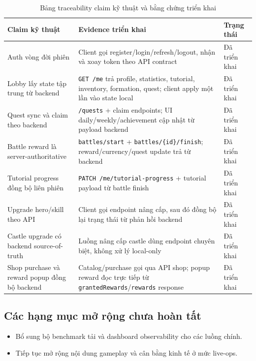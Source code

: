 \begin{table}[H]
\centering
\renewcommand{\arraystretch}{1.2}
\setlength{\tabcolsep}{6pt}
\begin{tabularx}{\textwidth}{|L{4.5cm}|Y|L{3.8cm}|}
\hline
\textbf{Claim kỹ thuật} & \textbf{Evidence triển khai} & \textbf{Trạng thái} \\
\hline
Auth vòng đời phiên & Client gọi register/\allowbreak login/\allowbreak refresh/\allowbreak logout, nhận và xoay token theo API contract & Đã triển khai \\
\hline
Lobby lấy state tập trung từ backend & \texttt{GET /me} trả profile, statistics, tutorial, inventory, formation, quest; client apply một lần vào state local & Đã triển khai \\
\hline
Quest sync và claim theo backend & \texttt{/quests} + claim endpoints; UI daily/\allowbreak weekly/\allowbreak achievement cập nhật từ payload backend & Đã triển khai \\
\hline
Battle reward là server-authoritative & \texttt{battles/start} + \texttt{battles/\{id\}/finish}; reward/\allowbreak currency/\allowbreak quest update trả từ backend & Đã triển khai \\
\hline
Tutorial progress đồng bộ liên phiên & \texttt{PATCH /me/tutorial-progress} + tutorial payload từ battle finish & Đã triển khai \\
\hline
Upgrade hero/\allowbreak skill theo API & Client gọi endpoint nâng cấp, sau đó đồng bộ lại trạng thái từ phản hồi backend & Đã triển khai \\
\hline
Castle upgrade có backend source-of-truth & Luồng nâng cấp castle dùng endpoint chuyên biệt, không xử lý local-only & Đã triển khai \\
\hline
Shop purchase và reward popup đồng bộ backend & Catalog/\allowbreak purchase gọi qua API shop; popup reward đọc trực tiếp từ \texttt{grantedRewards}/\texttt{rewards} response & Đã triển khai \\
\hline
\end{tabularx}
\caption{Bảng traceability claim kỹ thuật và bằng chứng triển khai}
\label{tab:claim-evidence}
\end{table}

\subsection{Các hạng mục mở rộng chưa hoàn tất}
\label{subsec:impl-open-items}

\begin{itemize}
    \item Bổ sung bộ benchmark tải và dashboard observability cho các luồng chính.
    \item Tiếp tục mở rộng nội dung gameplay và cân bằng kinh tế ở mức live-ops.
\end{itemize}

